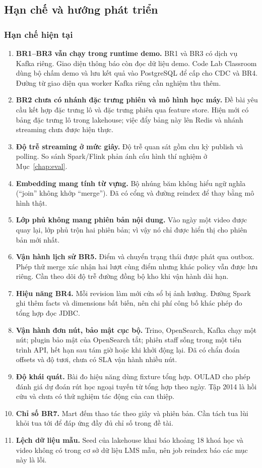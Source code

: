 \subsection{Hạn chế và hướng phát triển}
\label{chap:limits}

\subsubsection{Hạn chế hiện tại}

\begin{enumerate}
  \item \textbf{BR1--BR3 vẫn chạy trong runtime demo.} BR1 và BR3 có dịch vụ Kafka riêng. Giao diện thông báo còn đọc dữ liệu demo. Code Lab Classroom dùng bộ chấm demo và lưu kết quả vào PostgreSQL để cấp cho CDC và BR4. Đường từ giao diện qua worker Kafka riêng cần nghiệm thu thêm.
  \item \textbf{BR2 chưa có nhánh đặc trưng phiên và mô hình học máy.} Đề bài yêu cầu kết hợp đặc trưng lô và đặc trưng phiên qua feature store. Hiện mới có bảng đặc trưng lô trong lakehouse; việc đẩy bảng này lên Redis và nhánh streaming chưa được hiện thực.
  \item \textbf{Độ trễ streaming ở mức giây.} Độ trễ quan sát gồm chu kỳ publish và polling. So sánh Spark/Flink phản ánh cấu hình thí nghiệm ở Mục~\ref{chap:eval}.
  \item \textbf{Embedding mang tính từ vựng.} Bộ nhúng băm không hiểu ngữ nghĩa (``join'' không khớp ``merge''). Đã có cổng  và đường reindex để thay bằng mô hình thật.
  \item \textbf{Lớp phủ không mang phiên bản nội dung.} Vào ngày một video được quay lại, lớp phủ trộn hai phiên bản; vì vậy nó chỉ được hiển thị cho phiên bản mới nhất.
  \item \textbf{Vận hành lịch sử BR5.} Điểm và chuyển trạng thái được phát qua outbox. Phép thử merge xác nhận hai lượt cùng điểm nhưng khác policy vẫn được lưu riêng. Cần theo dõi độ trễ đường đồng bộ kho khi vận hành dài hạn.
  \item \textbf{Hiệu năng BR4.} Mỗi revision làm mới cửa sổ bị ảnh hưởng. Đường Spark ghi thêm facts và dimensions bất biến, nên chi phí công bố khác phép đo tổng hợp đọc JDBC.
  \item \textbf{Vận hành đơn nút, bảo mật cục bộ.} Trino, OpenSearch, Kafka chạy một nút; plugin bảo mật của OpenSearch tắt; phiên staff sống trong một tiến trình API, hết hạn sau tám giờ hoặc khi khởi động lại. Đã có chẩn đoán offsets và độ tươi, chưa có SLA vận hành nhiều nút.
  \item \textbf{Độ khái quát.} Bài đo hiệu năng dùng fixture tổng hợp. OULAD cho phép đánh giá dự đoán rút học ngoại tuyến từ tổng hợp theo ngày. Tập 2014 là hồi cứu và chưa có thử nghiệm tác động của can thiệp.
  \item \textbf{Chỉ số BR7.} Mart đếm thao tác  theo giây và phiên bản. Cần tách tua lùi khỏi tua tới để đáp ứng đầy đủ chỉ số  trong đề tài.
  \item \textbf{Lệch dữ liệu mẫu.} Seed của lakehouse khai báo khoảng 18 khoá học và video không có trong cơ sở dữ liệu LMS mẫu, nên job reindex báo các mục này là lỗi.
\end{enumerate}

